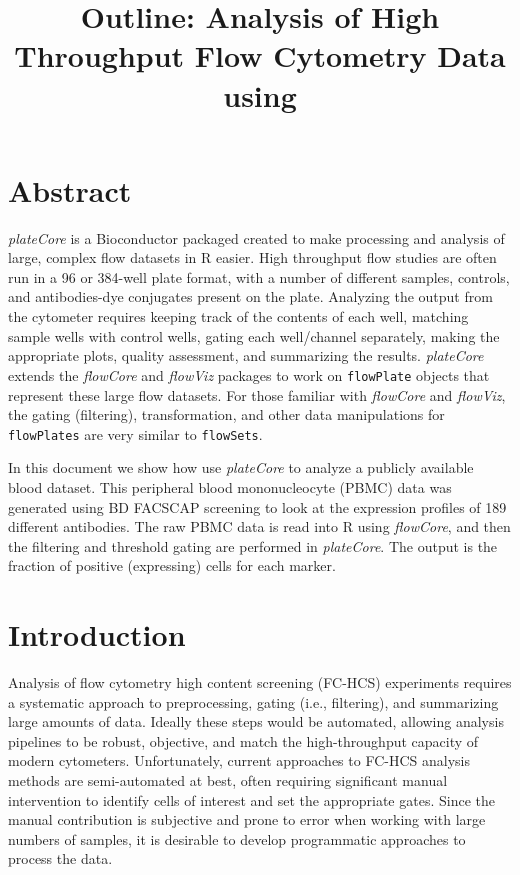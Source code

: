 \documentclass[12pt]{article}
\title{Outline: Analysis of High Throughput Flow Cytometry Data using \Rpackage{plateCore}}
\newcommand{\Rclass}[1]{{\texttt{#1}}}
\newcommand{\Rpackage}[1]{{\textit{#1}}}
\begin{document}
\maketitle

\tableofcontents

\section{Abstract}
\Rpackage{plateCore} is a Bioconductor packaged created to make processing and analysis of large, complex flow datasets
in R easier. High throughput flow studies are often run in a 96 or 384-well plate format, with a number of different samples, 
controls, and antibodies-dye conjugates present on the plate. Analyzing the output from the cytometer requires keeping track of the contents
of each well, matching sample wells with control wells, gating each well/channel separately, making the appropriate plots, quality assessment, and
summarizing the results. \Rpackage{plateCore} extends the \Rpackage{flowCore} and \Rpackage{flowViz} packages to work on
\Rclass{flowPlate} objects that represent these large flow datasets. For those familiar with \Rpackage{flowCore} and \Rpackage{flowViz}, 
the gating (filtering), transformation, and other data manipulations for \Rclass{flowPlates} are very similar to \Rclass{flowSets}. 

In this document we show how use \Rpackage{plateCore} to analyze a publicly available blood dataset. This peripheral blood
mononucleocyte (PBMC) data was generated using BD FACS\texttrademark CAP screening to look at the expression profiles of 189 
different antibodies. The raw PBMC data is read into R using \Rpackage{flowCore}, and then the filtering and 
threshold gating are performed in \Rpackage{plateCore}. The output is the fraction of positive (expressing) cells for
each marker.

\section{Introduction}
Analysis of flow cytometry high content screening (FC-HCS) experiments requires a systematic approach to
preprocessing, gating (i.e., filtering), and summarizing large amounts of data. Ideally these steps would be automated,
allowing analysis pipelines to be robust, objective, and match the high-throughput capacity of modern cytometers. 
Unfortunately, current approaches to FC-HCS analysis methods are semi-automated at best,
often requiring significant manual intervention to identify cells of interest and set the appropriate gates. 
Since the manual contribution is subjective and prone to error when working with large numbers of samples, it
is desirable to develop programmatic approaches to process the data.
\end{document}

